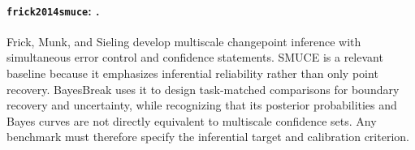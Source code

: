 
\paragraph{\texttt{frick2014smuce}: \citet{frick2014smuce}.}
Frick, Munk, and Sieling develop multiscale changepoint inference with simultaneous error control and confidence statements. SMUCE is a relevant baseline because it emphasizes inferential reliability rather than only point recovery. BayesBreak uses it to design task-matched comparisons for boundary recovery and uncertainty, while recognizing that its posterior probabilities and Bayes curves are not directly equivalent to multiscale confidence sets. Any benchmark must therefore specify the inferential target and calibration criterion.
